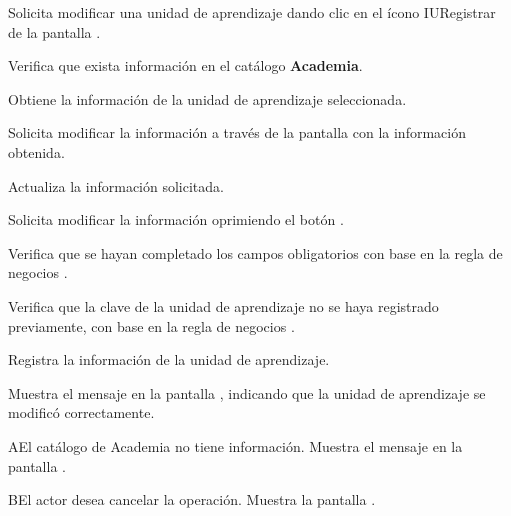 \begin{UCtrayectoria}
	\UCpaso [\UCactor] Solicita modificar una unidad de aprendizaje dando clic en el ícono IURegistrar de la pantalla . 
	
	\UCpaso [\UCsist] Verifica que exista información en el catálogo \textbf{Academia}. 
	
	\UCpaso [\UCsist] Obtiene la información de la unidad de aprendizaje seleccionada.
	
	\UCpaso [\UCsist] Solicita modificar la información a través de la pantalla  con la información obtenida.
	
	\UCpaso [\UCactor] Actualiza la información solicitada. \label{CUOE1.5.2:CompletaInfo}
	
	\UCpaso [\UCactor] Solicita modificar la información oprimiendo el botón . 
	
	\UCpaso [\UCsist] Verifica que se hayan completado los campos obligatorios con base en la regla de negocios . 
	
	\UCpaso [\UCsist] Verifica que la clave de la unidad de aprendizaje no se haya registrado previamente, con base en la regla de negocios . 
	
	\UCpaso [\UCsist] Registra la información de la unidad de aprendizaje.
	
	\UCpaso [\UCsist] Muestra el mensaje  en la pantalla , indicando que la unidad de aprendizaje se modificó correctamente.	
	
\end{UCtrayectoria}

\begin{UCtrayectoriaA}{A}{El catálogo de Academia no tiene información.}
	\UCpaso [\UCsist] Muestra el mensaje  en la pantalla . 
\end{UCtrayectoriaA}

\begin{UCtrayectoriaA}{B}{El actor desea cancelar la operación.}
	\UCpaso [\UCsist] Muestra la pantalla .  
\end{UCtrayectoriaA}

